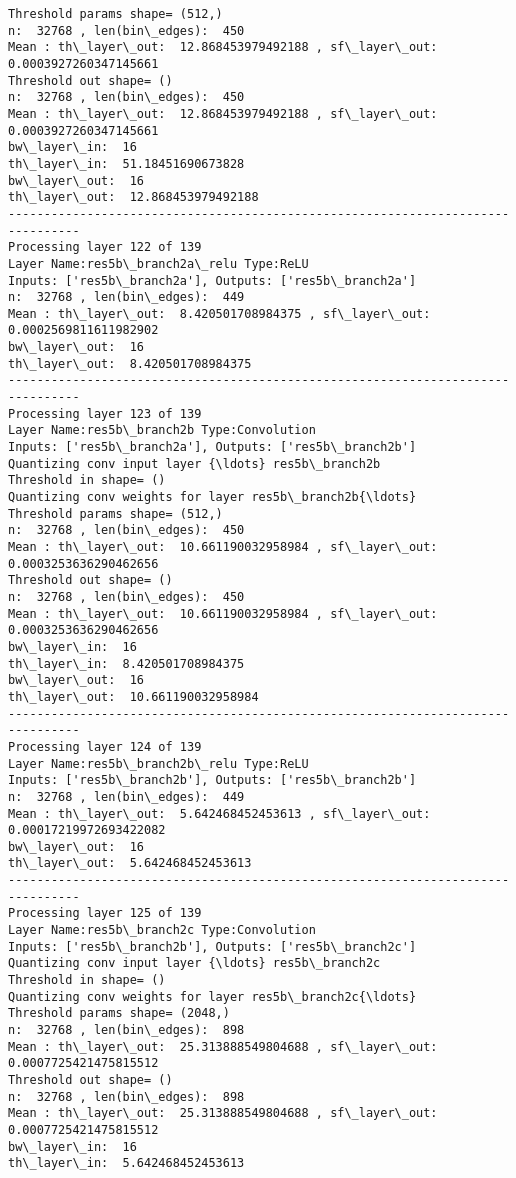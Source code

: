 \documentclass[11pt]{article}
\begin{document}
\begin{Verbatim}[commandchars=\\\{\}]
Threshold params shape= (512,)
n:  32768 , len(bin\_edges):  450
Mean : th\_layer\_out:  12.868453979492188 , sf\_layer\_out:  0.0003927260347145661
Threshold out shape= ()
n:  32768 , len(bin\_edges):  450
Mean : th\_layer\_out:  12.868453979492188 , sf\_layer\_out:  0.0003927260347145661
bw\_layer\_in:  16
th\_layer\_in:  51.18451690673828
bw\_layer\_out:  16
th\_layer\_out:  12.868453979492188
--------------------------------------------------------------------------------
Processing layer 122 of 139
Layer Name:res5b\_branch2a\_relu Type:ReLU
Inputs: ['res5b\_branch2a'], Outputs: ['res5b\_branch2a']
n:  32768 , len(bin\_edges):  449
Mean : th\_layer\_out:  8.420501708984375 , sf\_layer\_out:  0.0002569811611982902
bw\_layer\_out:  16
th\_layer\_out:  8.420501708984375
--------------------------------------------------------------------------------
Processing layer 123 of 139
Layer Name:res5b\_branch2b Type:Convolution
Inputs: ['res5b\_branch2a'], Outputs: ['res5b\_branch2b']
Quantizing conv input layer {\ldots} res5b\_branch2b
Threshold in shape= ()
Quantizing conv weights for layer res5b\_branch2b{\ldots}
Threshold params shape= (512,)
n:  32768 , len(bin\_edges):  450
Mean : th\_layer\_out:  10.661190032958984 , sf\_layer\_out:  0.0003253636290462656
Threshold out shape= ()
n:  32768 , len(bin\_edges):  450
Mean : th\_layer\_out:  10.661190032958984 , sf\_layer\_out:  0.0003253636290462656
bw\_layer\_in:  16
th\_layer\_in:  8.420501708984375
bw\_layer\_out:  16
th\_layer\_out:  10.661190032958984
--------------------------------------------------------------------------------
Processing layer 124 of 139
Layer Name:res5b\_branch2b\_relu Type:ReLU
Inputs: ['res5b\_branch2b'], Outputs: ['res5b\_branch2b']
n:  32768 , len(bin\_edges):  449
Mean : th\_layer\_out:  5.642468452453613 , sf\_layer\_out:  0.00017219972693422082
bw\_layer\_out:  16
th\_layer\_out:  5.642468452453613
--------------------------------------------------------------------------------
Processing layer 125 of 139
Layer Name:res5b\_branch2c Type:Convolution
Inputs: ['res5b\_branch2b'], Outputs: ['res5b\_branch2c']
Quantizing conv input layer {\ldots} res5b\_branch2c
Threshold in shape= ()
Quantizing conv weights for layer res5b\_branch2c{\ldots}
Threshold params shape= (2048,)
n:  32768 , len(bin\_edges):  898
Mean : th\_layer\_out:  25.313888549804688 , sf\_layer\_out:  0.0007725421475815512
Threshold out shape= ()
n:  32768 , len(bin\_edges):  898
Mean : th\_layer\_out:  25.313888549804688 , sf\_layer\_out:  0.0007725421475815512
bw\_layer\_in:  16
th\_layer\_in:  5.642468452453613

\end{Verbatim}
\end{document}
